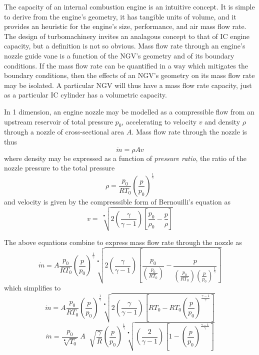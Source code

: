 \documentclass[a4paper, 11pt, oneside]{report}
\begin{document}
The capacity of an internal combustion engine is an intuitive concept. It is simple to derive from the engine's geometry, it has tangible units of volume, and it provides an heuristic for the engine's size, performance, and air mass flow rate. The design of turbomachinery invites an analagous concept to that of IC engine capacity, but a definition is not so obvious. Mass flow rate through an engine's nozzle guide vane is a function of the NGV's geometry and of its boundary conditions. If the mass flow rate can be quantified in a way which mitigates the boundary conditions, then the effects of an NGV's geometry on its mass flow rate may be isolated. A particular NGV will thus have a mass flow rate capacity, just as a particular IC cylinder has a volumetric capacity.

In 1 dimension, an engine nozzle may be modelled as a compressible flow from an upstream reservoir of total pressure $p_0$, accelerating to velocity $v$ and density $\rho$ through a nozzle of cross-sectional area $A$. Mass flow rate through the nozzle is thus
\begin{equation}
\dot{m} = \rho A v
\end{equation}
where density may be expressed as a function of \textit{pressure ratio}, the ratio of the nozzle pressure to the total pressure
\begin{equation}
\rho = \frac{p_0}{R T_0} \left(\frac{p}{p_0}\right)^\frac{1}{\gamma}
\end{equation}
and velocity is given by the compresssible form of Bernouilli's equation as
\begin{equation}
v = \>
\sqrt[•]{ 
	2 \left( \frac{\gamma}{\gamma - 1} \right) \left[ \frac{p_0}{\rho_0} - \frac{p}{\rho} \right] 
}
\end{equation}

The above equations combine to express mass flow rate through the nozzle as
\begin{equation}
\dot{m} =
A
\frac{p_0}{R T_0}
\left(\frac{p}{p_0}\right)^\frac{1}{\gamma}
\sqrt[•]{ 
2 \left( \frac{\gamma}{\gamma - 1} \right) 
\left[ \frac{p_0}{ \left( \frac{p_0}{R T_0} \right) } - \frac{p}{ \left( \frac{p_0}{R T_0} \right) \left(\frac{p}{p_0}\right)^\frac{1}{\gamma} } \right] 
}
\end{equation}
which simplifies to
\begin{equation}
\dot{m} =
A
\frac{p_0}{R T_0}
\left(\frac{p}{p_0}\right)^\frac{1}{\gamma}
\sqrt[•]{
	2 \left( 
		\frac{\gamma}{\gamma - 1} 
	\right)
	\left[ 
		R T_0 - R T_0 \left( \frac{p}{p_0} \right)^\frac{\gamma-1}{\gamma} 
	\right]
}
\end{equation}
\begin{equation}\label{mass_flow_rate_formula}
\dot{m} =
\frac{p_0}{\sqrt[•]{T_0}} \>
A \;
\sqrt[]{\frac{\gamma}{R}}
\left(
    \frac{p}{p_0}
\right)^\frac{1}{\gamma}
\sqrt[•]{
	\left(
		\frac{2}{\gamma - 1}  
	\right)
	\left[
		1 - \left( \frac{p}{p_0} \right)^\frac{\gamma-1}{\gamma}
	\right] 
}
\end{equation}
\end{document}
